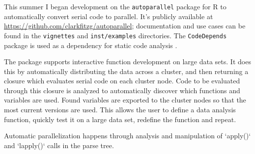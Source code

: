 \documentclass[12pt]{article}
\begin{document}
This summer I began development on the \texttt{autoparallel} package for R
to automatically convert serial code to parallel. It's publicly available
at \url{https://github.com/clarkfitzg/autoparallel}; documentation and use
cases can be found in the \texttt{vignettes} and \texttt{inst/examples}
directories. The \texttt{CodeDepends} package is used as a dependency for
static code analysis \cite{R-CodeDepends}.

The package supports interactive function development on large
data sets. It does this by automatically distributing the data across a
cluster, and then returning a closure which evaluates serial code on each
cluster node. Code to be evaluated through this closure is analyzed to
automatically discover which functions and variables are used. Found
variables are exported to the cluster nodes so that the most current
versions are used. This allows the user to define a data analysis function,
quickly test it on a large data set, redefine the function and repeat.

Automatic parallelization happens through analysis and manipulation of
`apply()` and `lapply()` calls in the parse tree.

\hfill


 
\end{document}
